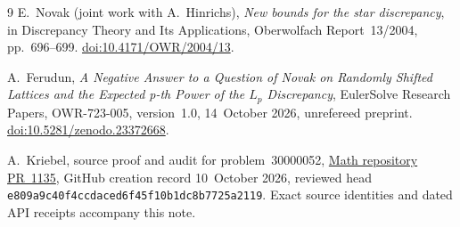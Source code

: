 \documentclass[11pt]{article}
\begin{document}
\begin{thebibliography}{9}
E.~Novak (joint work with A.~Hinrichs),
\emph{New bounds for the star discrepancy},
in Discrepancy Theory and Its Applications, Oberwolfach Report~13/2004,
pp.~696--699.
\href{https://doi.org/10.4171/OWR/2004/13}{doi:10.4171/OWR/2004/13}.

A.~Ferudun,
\emph{A Negative Answer to a Question of Novak on Randomly Shifted Lattices
and the Expected p-th Power of the $L_p$ Discrepancy},
EulerSolve Research Papers, OWR-723-005, version~1.0,
14~October 2026, unrefereed preprint.
\href{https://doi.org/10.5281/zenodo.23372668}{doi:10.5281/zenodo.23372668}.

A.~Kriebel, source proof and audit for problem~30000052,
\href{https://github.com/AlecKriebel/Math/pull/1135}{Math repository PR~1135},
GitHub creation record 10~October 2026, reviewed head
\texttt{e809a9c40f4ccdaced6f45f10b1dc8b7725a2119}.
Exact source identities and dated API receipts accompany this note.
\end{thebibliography}
\end{document}
